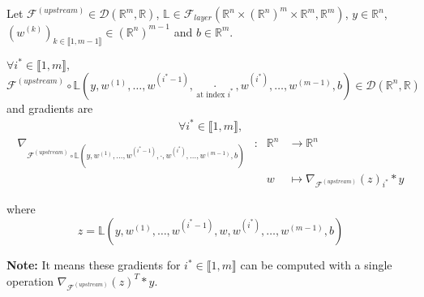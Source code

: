 \documentclass[11pt,en]{elegantpaper}
\newcommand{\Real}{\mathbb{R}}
\begin{document}
\begin{proposition}
  {\normalfont
    Let $\mathcal{F}^{(upstream)} \in \mathcal{D}(\Real^m,\Real)$,
      $\mathbb{L} \in \mathcal{F}_{layer}(\Real^n \times (\Real^n)^m \times \Real^m,\Real^m)$,
      $y \in \Real^n$, $(w^{(k)})_{k \in \llbracket 1,m-1 \rrbracket} \in (\Real^n)^{m-1}$ and $b \in \Real^m$. \par
    $\forall i^* \in \llbracket 1,m \rrbracket,$
    $\mathcal{F}^{(upstream)} \circ \mathbb{L}(y,w^{(1)},\ldots,w^{(i^*-1)},\underset{\text{at index $i^*$}}{\cdot},w^{(i^*)},\ldots,w^{(m-1)},b) \in \mathcal{D}(\Real^n, \Real)$
    and gradients are \begin{equation*}
      \begin{gathered}
        \forall i^* \in \llbracket 1,m \rrbracket,
      \end{gathered}
    \end{equation*}
    \begin{equation}
      \begin{array}{llll}
        \nabla_{\mathcal{F}^{(upstream)} \circ \mathbb{L}(y,w^{(1)},\ldots,w^{(i^*-1)},\cdot,w^{(i^*)},\ldots,w^{(m-1)},b)} & : & \Real^n  & \longrightarrow \Real^n \\
        &  & w & \longmapsto \nabla_{\mathcal{F}^{(upstream)}}(z)_{i^*} * y
      \end{array}
    \end{equation} \par
    where \begin{equation*}
      z = \mathbb{L}(y,w^{(1)},\ldots,w^{(i^*-1)},w,w^{(i^*)},\ldots,w^{(m-1)},b)
    \end{equation*}

    \textbf{Note:} It means these gradients for $i^* \in \llbracket 1,m \rrbracket$ can be computed with a single operation $\nabla_{\mathcal{F}^{(upstream)}}(z)^T * y$.
  }
\end{proposition}
\end{document}
